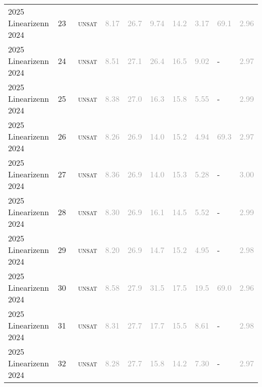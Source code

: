 \begin{center}
{\begin{longtable}{@{}llllllllll@{}}
2025 Linearizenn 2024 & 23 & ~\textsc{unsat} & \textcolor{darkgray}{8.17} & \textcolor{darkgray}{26.7} & \textcolor{darkgray}{9.74} & \textcolor{darkgray}{14.2} & \textcolor{darkgray}{3.17} & \textcolor{darkgray}{69.1} & \textcolor{darkgray}{2.96} \\
2025 Linearizenn 2024 & 24 & ~\textsc{unsat} & \textcolor{darkgray}{8.51} & \textcolor{darkgray}{27.1} & \textcolor{darkgray}{26.4} & \textcolor{darkgray}{16.5} & \textcolor{darkgray}{9.02} & - & \textcolor{darkgray}{2.97} \\
2025 Linearizenn 2024 & 25 & ~\textsc{unsat} & \textcolor{darkgray}{8.38} & \textcolor{darkgray}{27.0} & \textcolor{darkgray}{16.3} & \textcolor{darkgray}{15.8} & \textcolor{darkgray}{5.55} & - & \textcolor{darkgray}{2.99} \\
2025 Linearizenn 2024 & 26 & ~\textsc{unsat} & \textcolor{darkgray}{8.26} & \textcolor{darkgray}{26.9} & \textcolor{darkgray}{14.0} & \textcolor{darkgray}{15.2} & \textcolor{darkgray}{4.94} & \textcolor{darkgray}{69.3} & \textcolor{darkgray}{2.97} \\
2025 Linearizenn 2024 & 27 & ~\textsc{unsat} & \textcolor{darkgray}{8.36} & \textcolor{darkgray}{26.9} & \textcolor{darkgray}{14.0} & \textcolor{darkgray}{15.3} & \textcolor{darkgray}{5.28} & - & \textcolor{darkgray}{3.00} \\
2025 Linearizenn 2024 & 28 & ~\textsc{unsat} & \textcolor{darkgray}{8.30} & \textcolor{darkgray}{26.9} & \textcolor{darkgray}{16.1} & \textcolor{darkgray}{14.5} & \textcolor{darkgray}{5.52} & - & \textcolor{darkgray}{2.99} \\
2025 Linearizenn 2024 & 29 & ~\textsc{unsat} & \textcolor{darkgray}{8.20} & \textcolor{darkgray}{26.9} & \textcolor{darkgray}{14.7} & \textcolor{darkgray}{15.2} & \textcolor{darkgray}{4.95} & - & \textcolor{darkgray}{2.98} \\
2025 Linearizenn 2024 & 30 & ~\textsc{unsat} & \textcolor{darkgray}{8.58} & \textcolor{darkgray}{27.9} & \textcolor{darkgray}{31.5} & \textcolor{darkgray}{17.5} & \textcolor{darkgray}{19.5} & \textcolor{darkgray}{69.0} & \textcolor{darkgray}{2.96} \\
2025 Linearizenn 2024 & 31 & ~\textsc{unsat} & \textcolor{darkgray}{8.31} & \textcolor{darkgray}{27.7} & \textcolor{darkgray}{17.7} & \textcolor{darkgray}{15.5} & \textcolor{darkgray}{8.61} & - & \textcolor{darkgray}{2.98} \\
2025 Linearizenn 2024 & 32 & ~\textsc{unsat} & \textcolor{darkgray}{8.28} & \textcolor{darkgray}{27.7} & \textcolor{darkgray}{15.8} & \textcolor{darkgray}{14.2} & \textcolor{darkgray}{7.30} & - & \textcolor{darkgray}{2.97} \\

\end{longtable}}
\end{center}
